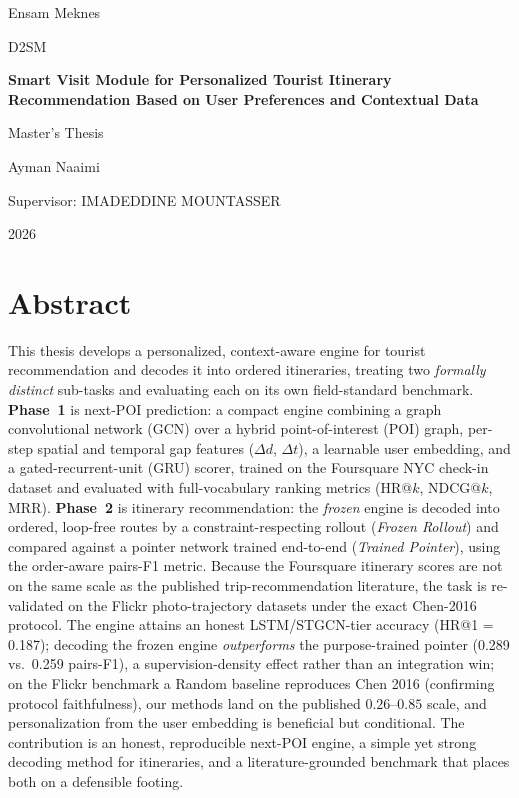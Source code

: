 \documentclass[12pt,oneside]{book}
\newcommand{\ThesisTitle}{Smart Visit Module for Personalized Tourist Itinerary Recommendation Based on User Preferences and Contextual Data}
\newcommand{\ThesisAuthor}{Ayman Naaimi}
\newcommand{\ThesisDegree}{Master's Thesis}
\newcommand{\ThesisProgram}{D2SM}
\newcommand{\ThesisUniversity}{Ensam Meknes}
\newcommand{\ThesisYear}{2026}
\newcommand{\ThesisSupervisor}{IMADEDDINE MOUNTASSER}
\begin{document}
\frontmatter
\begin{titlepage}
  \centering
  \vspace*{1.5cm}
  {\Large \ThesisUniversity \par}
  \vspace{1.0cm}
  {\Large \ThesisProgram \par}
  \vspace{1.8cm}
  {\Huge \bfseries \ThesisTitle \par}
  \vspace{2.0cm}
  {\Large \ThesisDegree \par}
  \vspace{1.0cm}
  {\Large \ThesisAuthor \par}
  \vfill
  {\large Supervisor: \ThesisSupervisor \par}
  \vspace{0.5cm}
  {\large \ThesisYear \par}
\end{titlepage}

\chapter*{Abstract}
This thesis develops a personalized, context-aware engine for tourist recommendation and
decodes it into ordered itineraries, treating two \emph{formally distinct} sub-tasks and
evaluating each on its own field-standard benchmark. \textbf{Phase~1} is next-POI prediction:
a compact engine combining a graph convolutional network (GCN) over a hybrid point-of-interest
(POI) graph, per-step spatial and temporal gap features ($\Delta d$, $\Delta t$), a learnable
user embedding, and a gated-recurrent-unit (GRU) scorer, trained on the Foursquare NYC
check-in dataset and evaluated with full-vocabulary ranking metrics (HR@$k$, NDCG@$k$, MRR).
\textbf{Phase~2} is itinerary recommendation: the \emph{frozen} engine is decoded into ordered,
loop-free routes by a constraint-respecting rollout (\emph{Frozen Rollout}) and compared
against a pointer network trained end-to-end (\emph{Trained Pointer}), using the order-aware
pairs-F1 metric. Because the Foursquare itinerary scores are not on the same scale as the
published trip-recommendation literature, the task is re-validated on the Flickr
photo-trajectory datasets under the exact Chen-2016 protocol. The engine attains an honest
LSTM/STGCN-tier accuracy (HR@1 = 0.187); decoding the frozen engine \emph{outperforms} the
purpose-trained pointer (0.289 vs.\ 0.259 pairs-F1), a supervision-density effect rather than
an integration win; on the Flickr benchmark a Random baseline reproduces Chen 2016 (confirming
protocol faithfulness), our methods land on the published $0.26$--$0.85$ scale, and
personalization from the user embedding is beneficial but conditional. The contribution is an
honest, reproducible next-POI engine, a simple yet strong decoding method for itineraries, and
a literature-grounded benchmark that places both on a defensible footing.
\end{document}
